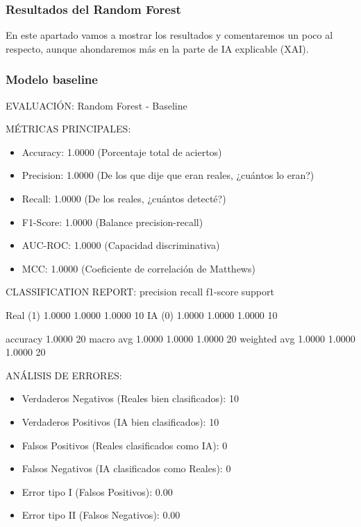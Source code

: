 \subsubsection*{Resultados del Random Forest}

En este apartado vamos a mostrar los resultados y comentaremos un poco  al respecto, aunque ahondaremos más en la parte de IA explicable (XAI).

\subsubsection*{Modelo baseline}

EVALUACIÓN: Random Forest - Baseline

MÉTRICAS PRINCIPALES:
\begin{itemize}
	\item Accuracy:  1.0000  (Porcentaje total de aciertos)
	\item Precision: 1.0000  (De los que dije que eran reales, ¿cuántos lo eran?)
	\item Recall:    1.0000  (De los reales, ¿cuántos detecté?)
	\item F1-Score:  1.0000  (Balance precision-recall)
	\item AUC-ROC:   1.0000  (Capacidad discriminativa)
	\item MCC:       1.0000  (Coeficiente de correlación de Matthews)
\end{itemize}

CLASSIFICATION REPORT:
              precision    recall  f1-score   support

    Real (1)     1.0000    1.0000    1.0000        10
      IA (0)     1.0000    1.0000    1.0000        10

    accuracy                         1.0000        20
   macro avg     1.0000    1.0000    1.0000        20
weighted avg     1.0000    1.0000    1.0000        20


ANÁLISIS DE ERRORES:
\begin{itemize}
	\item Verdaderos Negativos (Reales bien clasificados): 10
	\item Verdaderos Positivos (IA bien clasificados): 10
	\item Falsos Positivos (Reales clasificados como IA): 0
	\item Falsos Negativos (IA clasificados como Reales): 0
	\item Error tipo I (Falsos Positivos): 0.00%
	\item Error tipo II (Falsos Negativos): 0.00%
\end{itemize}

